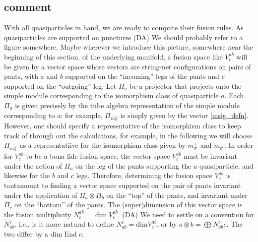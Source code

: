 \documentclass[12pt,a4paper]{article}
\newcommand{\tp}{\otimes}
\newcommand{\dave}[1]{{\color{ao(english)}\footnotesize{(DA) #1}}}
\begin{document}
 
\subsection{comment}
With all quasiparticles in hand, we are ready to compute their fusion rules. As quasiparticles are supported on punctures \dave{We should probably refer to a figure somewhere. Maybe wherever we introduce this picture, somewhere near the beginning of this section.} of the underlying manifold, a fusion space like $V^{ab}_c$ will be given by a vector space whose vectors are string-net configurations on pairs of pants, with $a$ and $b$ supported on the ``incoming'' legs of the pants and $c$ supported on the ``outgoing'' leg. 
Let $\Pi_a$ be a projector that projects onto the simple module corresponding to the isomorphism class of quasiparticle $a$.
Each $\Pi_a$ is given precisely by the tube algebra representation of the simple module corresponding to $a$: for example, $\Pi_{m_\sigma^\pm}$ is simply given by the vector \eqref{msig_defn}. 
However, one should specify a representative of the isomorphism class to keep track of through out the calculations, for example, in the following we will choose $\Pi_{m_{\sigma}^+}$ as a representatiive for the isomorphism class given by $m_{\sigma}^+$ and $m_{\sigma}^-$.
In order for $V^{ab}_c$ to be a bona fide fusion space, the vector space $V^{ab}_c$ must be invariant under the action of $\Pi_a$ on the leg of the pants supporting the $a$ quasiparticle, and likewise for the $b$ and $c$ legs. Therefore, determining the fusion space $V^{ab}_c$ is tantamount to finding a vector space supported on the pair of pants invariant under the application of $\Pi_a\tp \Pi_b$ on the ``top'' of the pants, and invariant under $\Pi_c$ on the ``bottom'' of the pants. The (super)dimension of this vector space is the fusion multiplicity $N^{ab}_c = \dim V^{ab}_c$. 
\dave{We need to settle on a convention for $N_{ab}^c$. 
i.e., is it more natural to define $N_{ab}^c = \text{dim} V^{ab}_c$, or by $a \tp b  = \bigoplus N_{ab}^c c$.
The two differ by a $\text{dim End}\; c$.}
\end{document}
